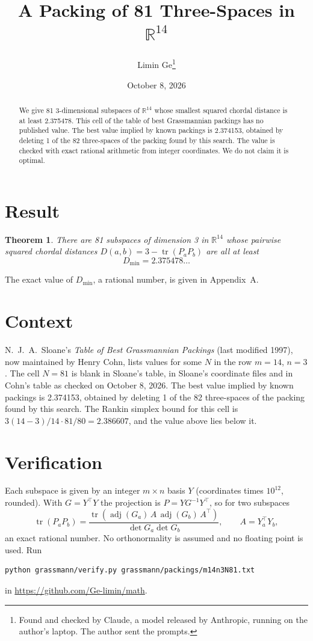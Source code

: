 \documentclass[11pt,a4paper]{article}
\title{A Packing of 81 Three-Spaces in $\mathbb{R}^{14}$}
\author{Limin Ge\thanks{Found and checked by Claude, a model released by Anthropic, running on the author's laptop. The author sent the prompts.}}
\date{October 8, 2026}
\newtheorem*{theorem}{Theorem}
\begin{document}
\maketitle
\begin{abstract}
We give 81 3-dimensional subspaces of $\mathbb{R}^{14}$ whose smallest squared chordal distance is at least 2.375478. This cell of the table of best Grassmannian packings has no published value. The best value implied by known packings is 2.374153, obtained by deleting 1 of the 82 three-spaces of the packing found by this search. The value is checked with exact rational arithmetic from integer coordinates. We do not claim it is optimal.
\end{abstract}

\section{Result}
\begin{theorem}
There are 81 subspaces of dimension 3 in $\mathbb{R}^{14}$ whose pairwise squared chordal distances $D(a,b) = 3 - \operatorname{tr}(P_aP_b)$ are all at least
\[ D_{\min} = 2.375478\ldots \]
\end{theorem}
The exact value of $D_{\min}$, a rational number, is given in Appendix~A.


\section{Context}
N.~J.~A.~Sloane's \emph{Table of Best Grassmannian Packings} (last modified 1997), now maintained by Henry Cohn, lists values for some $N$ in the row $m=14$, $n=3$. The cell $N=81$ is blank in Sloane's table, in Sloane's coordinate files and in Cohn's table as checked on October 8, 2026. The best value implied by known packings is 2.374153, obtained by deleting 1 of the 82 three-spaces of the packing found by this search. The Rankin simplex bound for this cell is $3(14-3)/14\cdot 81/80 = 2.386607$, and the value above lies below it.


\section{Verification}
Each subspace is given by an integer $m\times n$ basis $Y$ (coordinates times $10^{12}$, rounded). With $G=Y^\top Y$ the projection is $P=YG^{-1}Y^\top$, so for two subspaces
\[ \operatorname{tr}(P_aP_b)=\frac{\operatorname{tr}(\operatorname{adj}(G_a)\,A\,\operatorname{adj}(G_b)\,A^\top)}{\det G_a\det G_b},\qquad A=Y_a^\top Y_b, \]
an exact rational number. No orthonormality is assumed and no floating point is used. Run
\begin{verbatim}
python grassmann/verify.py grassmann/packings/m14n3N81.txt
\end{verbatim}
in \url{https://github.com/Ge-limin/math}.
\end{document}
